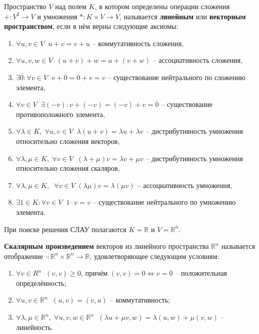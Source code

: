 \documentclass{article}
\begin{document}
\begin{define}\label{eq:linear_space}
	Пространство $V$ над полем $K$, в котором определены операции сложения
	$+: V^2\rightarrow V$ и умножения $*: K\times V\rightarrow V$,
	называется \textbf{линейным} или \textbf{векторным пространством}, если
	в нём верны следующие аксиомы:

	\begin{enumerate}[nosep]
		\item $\forall u,v\in V\;\; u+v=v+u$ -- коммутативность
			сложения,
		\item $\forall u,v,w\in V\;\; (u+v)+w=u+(v+w)$ --
			ассоциативность сложения,
		\item $\exists\overline{0}: \forall v\in V\;\;
			v+\overline{0}=\overline{0}+v=v$ -- существование
			нейтрального по сложению элемента,
		\item $\forall v\in V\;\;\exists (-v): v+(-v)=(-v)+v=
			\overline{0}$ -- существование противоположного
			элемента,
		\item $\forall\lambda\in K,\;\forall u,v\in V\;\; \lambda(u+v)=
			\lambda u+\lambda v$ -- дистрибутивность умножения
			относительно сложения векторов,
		\item $\forall\lambda,\mu\in K,\;\forall v\in V\;\;
			(\lambda+\mu)v=\lambda v+\mu v$ -- дистрибутивность
			умножения относительно сложения скаляров,
		\item $\forall\lambda,\mu\in K,\;\;\forall v\in V\; (\lambda\mu)
			v=\lambda(\mu v)$ -- ассоциативность умножения,
		\item $\exists 1\in K: \forall v\in V\;\; 1\cdot v=v$ --
			существование нейтрального по умножению элемента.
	\end{enumerate}
\end{define}

При поиске решения СЛАУ полагаются $K=\mathbb R$ и $V=\mathbb R^n$.

\begin{define}\label{eq:dot_production}
	\textbf{Скалярным произведением} векторов из линейного пространства
	$\mathbb R^n$ называется отображение $\cdot: \mathbb R^n\times
	\mathbb R^n\rightarrow \mathbb R$, удовлетворяющее следующим условиям:
	\begin{enumerate}[nosep]
		\item $\forall v\in R^n\;\; (v,v)\ge 0$, причём $(v,v)=0
			\Leftrightarrow v=\overline{0}$ -- положительная
			определённость;
		\item $\forall u,v\in \mathbb R^n\;\; (u,v)=(v,u)$ --
			коммутативность;
		\item $\forall \lambda,\mu \in\mathbb R^n,\;
			\forall u,v,w\in \mathbb R^n\;\; (\lambda u+\mu v, w)=
			\lambda(u,w)+\mu(v,w)$ -- линейность.
	\end{enumerate}
\end{define}
\newpage
\end{document}
